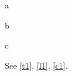 \documentclass[envcountsame]{llncs}
\begin{document}
\begin{theorem}\label{t1}a\end{theorem}
\begin{lemma}\label{l1}b\end{lemma}
\begin{claimx}\label{c1}c\end{claimx}
See \autoref{t1}, \autoref{l1}, \autoref{c1}.
\end{document}
